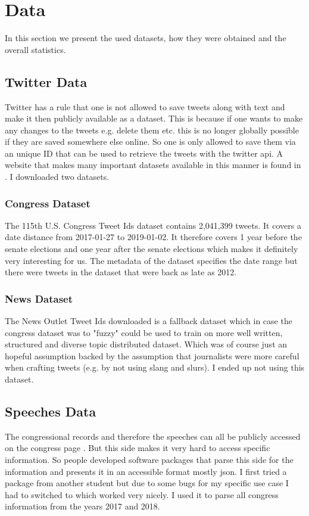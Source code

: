 \documentclass[10pt,conference,compsocconf]{IEEEtran}
\begin{document}
\section{Data}
\label{sec:Data}
In this section we present the used datasets, how they were obtained and the overall statistics. 
\subsection{Twitter Data}
Twitter has a rule that one is not allowed to save tweets along with text and make it then publicly available as a dataset. This is because if one wants to make any changes to the tweets e.g. delete them etc. this is no longer globally possible if they are saved somewhere else online. So one is only allowed to save them via an unique ID that can be used to retrieve the tweets with the twitter api. A website that makes many important datasets available in this manner is found in  \cite{twitter_datasets}. I downloaded two datasets.
\subsubsection{Congress Dataset}
The 115th U.S. Congress Tweet Ids dataset contains 2,041,399 tweets. It covers a date distance from 2017-01-27 to 2019-01-02. It therefore covers 1 year before the senate elections and one year after the senate elections which makes it definitely very interesting for us. The metadata of the dataset specifies the date range but there were tweets in the dataset that were back as late as 2012. 
\subsubsection{News Dataset}
The News Outlet Tweet Ids downloaded is a fallback dataset which in case the congress dataset was to "fuzzy" could be used to train on more well written, structured and diverse topic distributed dataset. Which was of course just an hopeful assumption backed by the assumption that journalists were more careful when crafting tweets (e.g. by not using slang and slurs). I ended up not using this dataset. 
\subsection{Speeches Data}
The congressional records and therefore the speeches can all be publicly accessed on the congress page \cite{congress_page}. But this side makes it very hard to access specific information. So people developed software packages that parse this side for the information and presents it in an accessible format mostly json. I first tried a package from another student but due to some bugs for my specific use case I had to switched to \cite{congress-downloader} which worked very nicely. I used it to parse all congress information from the years 2017 and 2018. 
\end{document}
